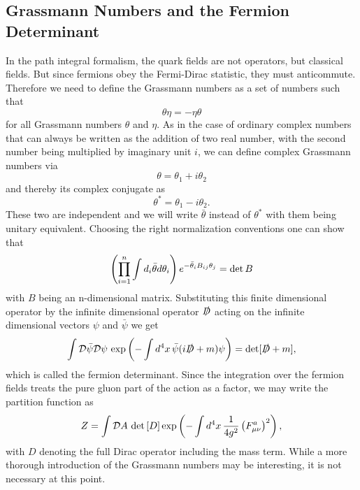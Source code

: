 \subsection{Grassmann Numbers and the Fermion Determinant}
In the path integral formalism, the quark fields are not operators, but classical fields. But since fermions obey the Fermi-Dirac statistic, they must anticommute. Therefore we need to define the Grassmann numbers as a set of numbers such that
\begin{equation}
    \theta \eta=-\eta\theta
\end{equation}
for all Grassmann numbers $\theta$ and $\eta$. As in the case of ordinary complex numbers that can always be written as the addition of two real number, with the second number being multiplied by imaginary unit $i$, we can define complex Grassmann numbers via
\begin{equation}
    \theta = \theta_1 +i\theta_2
\end{equation} and thereby its complex conjugate as
\begin{equation}
    \theta^* = \theta_1 -i\theta_2.
\end{equation}
These two are independent and we will write $\bar\theta$ instead of $\theta^*$ with them being unitary equivalent. Choosing the right normalization conventions one can show that
\begin{equation}
    \left(\prod_{i=1}^n\int d_i\bar\theta d\theta_i\right)e^{-\bar\theta_iB_{ij}\theta_j}=\det B 
\end{equation}
with $B$ being an n-dimensional matrix. Substituting this finite dimensional operator by the infinite dimensional operator $\slashed D$ acting on the infinite dimensional vectors $\psi$ and $\bar\psi$ we get
\begin{equation}
    \int \mathcal D\bar \psi\mathcal D\psi\, \exp\left(-\int d^4x\,\bar\psi(i\slashed D+m)\psi\right) = \det [\slashed D+m],
\end{equation}
which is called the fermion determinant. Since the integration over the fermion fields treats the pure gluon part of the action as a factor, we may write the partition function as
\begin{equation}
    Z=\int \mathcal DA\, \det\left[D\right]\exp\left(-\int d^4x\,\frac{1}{4g^2}\left(F_{\mu\nu}^a\right)^2\right),
\end{equation}
with $D$ denoting the full Dirac operator including the mass term. While a more thorough introduction of the Grassmann numbers may be interesting, it is not necessary at this point.

